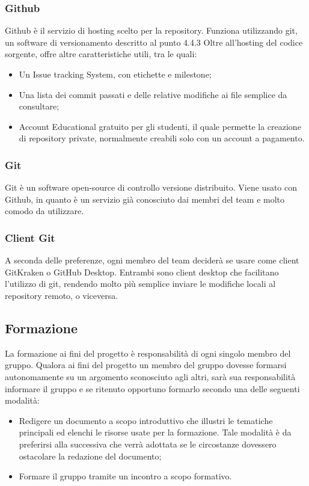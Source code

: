 \subsubsection{Github}
Github è il servizio di hosting scelto per la repository. Funziona utilizzando git, un software di versionamento descritto al punto 4.4.3 Oltre all'hosting del codice sorgente, offre altre caratteristiche utili, tra le quali:
\begin{itemize}  
\item Un Issue tracking System, con etichette e milestone;
\item Una lista dei commit passati e delle relative modifiche ai file semplice da consultare;
\item Account Educational gratuito per gli studenti, il quale permette la creazione di repository private, normalmente creabili solo con un account a pagamento.
\end{itemize}

\subsubsection{Git}
Git è un software open-source di controllo versione distribuito. 
Viene usato con Github, in quanto è un servizio già conosciuto dai membri del team e molto comodo da utilizzare.

\subsubsection{Client Git}
A seconda delle preferenze, ogni membro del team deciderà se usare come client GitKraken o GitHub Desktop. Entrambi sono client desktop che facilitano l'utilizzo di git, rendendo molto più semplice inviare le modifiche locali al repository remoto, o viceversa.

\subsection{Formazione}
La formazione ai fini del progetto è responsabilità di ogni singolo membro del gruppo. Qualora ai fini del progetto un membro del gruppo dovesse formarsi autonomamente su un argomento sconosciuto agli altri, sarà sua responsabilità informare il gruppo e se ritenuto opportuno formarlo secondo una delle seguenti modalità: 
\begin{itemize}  
\item Redigere un documento a scopo introduttivo che illustri le tematiche principali ed 
elenchi le risorse usate per la formazione. Tale modalità è da preferirsi alla successiva che verrà adottata se le circostanze dovessero ostacolare la redazione del documento;
\item Formare il gruppo tramite un incontro a scopo formativo.
\end{itemize}
\pagebreak